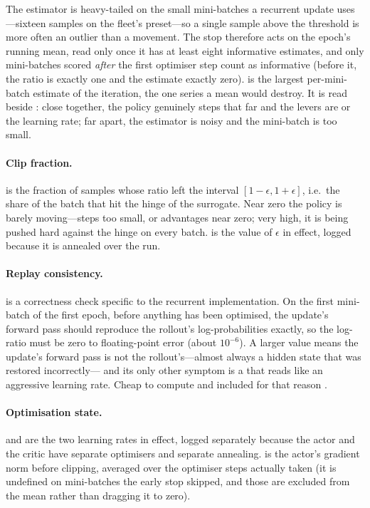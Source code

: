 The estimator is heavy-tailed on the small mini-batches a recurrent update
uses---sixteen samples on the fleet's preset---so a single sample above the
threshold is more often an outlier than a movement. The stop therefore acts
on the epoch's running mean, read only once it has at least eight informative
estimates, and only mini-batches scored \emph{after} the first optimiser step
count as informative (before it, the ratio is exactly one and the estimate
exactly zero).  is the largest per-mini-batch estimate of
the iteration, the one series a mean would destroy. It is read beside
: close together, the policy genuinely steps that far and the
levers are  or the learning rate; far apart, the estimator is
noisy and the mini-batch is too small.

\paragraph{Clip fraction.}
 is the fraction of samples whose ratio left the interval
$[1-\epsilon, 1+\epsilon]$, i.e.\ the share of the batch that hit the hinge of
the surrogate. Near zero the policy is barely moving---steps too small, or
advantages near zero; very high, it is being pushed hard against the hinge on
every batch.  is the value of $\epsilon$ in effect, logged
because it is annealed over the run.

\paragraph{Replay consistency.}
 is a correctness check specific to the recurrent
implementation. On the first mini-batch of the first epoch, before anything
has been optimised, the update's forward pass should reproduce the rollout's
log-probabilities exactly, so the log-ratio must be zero to floating-point
error (about $10^{-6}$). A larger value means the update's forward pass is not
the rollout's---almost always a hidden state that was restored incorrectly---
and its only other symptom is a  that reads like an aggressive
learning rate. Cheap to compute and included for that reason
\cite{engstrom2020implementation}.

\paragraph{Optimisation state.}
 and  are the two learning rates in effect,
logged separately because the actor and the critic have separate optimisers
and separate annealing.  is the actor's gradient norm
before clipping, averaged over the optimiser steps actually taken (it is
undefined on mini-batches the early stop skipped, and those are excluded from
the mean rather than dragging it to zero).

